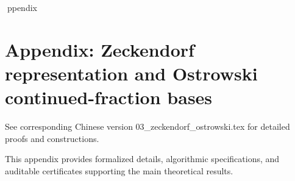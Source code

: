 ppendix

\section*{Appendix: Zeckendorf representation and Ostrowski continued-fraction bases}

See corresponding Chinese version 03_zeckendorf_ostrowski.tex for detailed proofs and constructions.

This appendix provides formalized details, algorithmic specifications, and auditable certificates supporting the main theoretical results.
